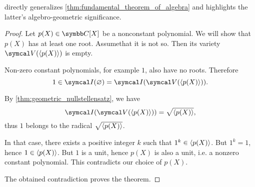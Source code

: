 \begin{corollary}\label{thm:nullstellensatz_implies_fundamental_theorem_of_algebra}
   directly generalizes \cref{thm:fundamental_theorem_of_algebra} and highlights the latter's algebro-geometric significance.
\end{corollary}
\begin{proof}
  Let \( p(X) \in \Co[X] \) be a nonconstant polynomial. We will show that \( p(X) \) has at least one root. Assume\LEM that it is not so. Then its variety \( \Cal{V}(\Gen{p(X)}) \) is empty.

  Non-zero constant polynomials, for example \( 1 \), also have no roots. Therefore
  \begin{equation*}
    1 \in \Cal{I}(\varnothing) = \Cal{I}(\Cal{V}(\Gen{p(X)})).
  \end{equation*}

  By \cref{thm:geometric_nullstellensatz}, we have
  \begin{equation*}
    \Cal{I}(\Cal{V}(\Gen{p(X)})) = \sqrt{\Gen{p(X)}},
  \end{equation*}
  thus \( 1 \) belongs to the radical \( \sqrt{\left\langle p(X) \right\rangle} \).

  In that case, there exists a positive integer \( k \) such that \( 1^k \in \left\langle p(X) \right\rangle \). But \( 1^k = 1 \), hence \( 1 \in \left\langle p(X) \right\rangle \). But \( 1 \) is a unit, hence \( p(X) \) is also a unit, i.e. a nonzero constant polynomial. This contradicts our choice of \( p(X) \).

  The obtained contradiction proves the theorem.
\end{proof}
